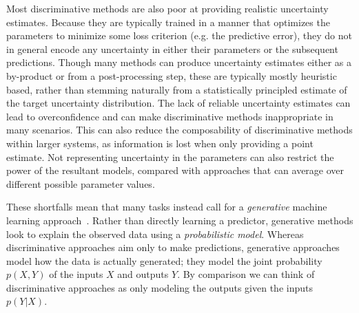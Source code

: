 Most discriminative methods are also poor at providing realistic uncertainty estimates.
Because they are typically trained in a manner that optimizes the parameters to minimize
some loss criterion (e.g. the predictive error), they do not in general encode any uncertainty
in either their parameters or the subsequent predictions.  Though many methods can
produce uncertainty estimates either as a by-product or from a post-processing step,
these are typically mostly heuristic based, rather than stemming naturally from a statistically
principled estimate of the target uncertainty distribution.   The lack of reliable uncertainty
estimates can lead to overconfidence and can make discriminative methods inappropriate in
many scenarios.  This can also reduce the composability of discriminative methods within
larger systems, as information is lost when only providing a point estimate.
Not representing uncertainty in the parameters can also restrict the power of the resultant
models, compared with approaches that can average over different possible parameter values.

These shortfalls mean that many tasks instead call for a \emph{generative} machine learning
approach~\citep{ng2002discriminative,bishop2006pattern}.  Rather than directly learning a 
predictor, generative methods look to explain the observed data using a \emph{probabilistic model}.
Whereas discriminative approaches aim only to make predictions, generative approaches model
how the data is actually generated; they model the joint probability $p(X,Y)$ of the inputs 
$X$ and outputs $Y$.  By comparison we can think of discriminative approaches as
only modeling the outputs given the inputs $p(Y|X)$.  

